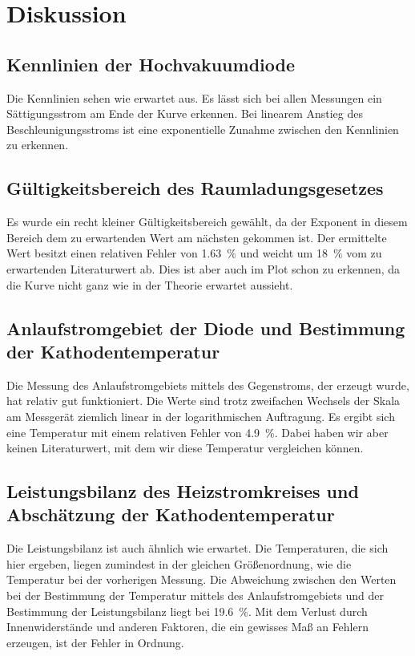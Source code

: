 \section{Diskussion}
\label{sec:Diskussion}

\subsection{Kennlinien der Hochvakuumdiode}
Die Kennlinien sehen wie erwartet aus. Es lässt sich bei allen Messungen ein Sättigungsstrom am Ende der Kurve erkennen. 
Bei linearem Anstieg des Beschleunigungsstroms ist eine exponentielle Zunahme zwischen den Kennlinien zu erkennen. %

\subsection{Gültigkeitsbereich des Raumladungsgesetzes}
Es wurde ein recht kleiner Gültigkeitsbereich gewählt, da der Exponent in diesem Bereich dem zu erwartenden Wert am 
nächsten gekommen ist. 
Der ermittelte Wert besitzt einen relativen Fehler von \SI{1.63}{\percent} und weicht um \SI{18}{\percent} vom zu 
erwartenden Literaturwert ab. 
Dies ist aber auch im Plot schon zu erkennen, da die Kurve nicht ganz wie in der Theorie erwartet aussieht. 

\subsection{Anlaufstromgebiet der Diode und Bestimmung der Kathodentemperatur}
Die Messung des Anlaufstromgebiets mittels des Gegenstroms, der erzeugt wurde, hat relativ gut funktioniert. 
Die Werte sind trotz zweifachen Wechsels der Skala am Messgerät ziemlich linear in der logarithmischen Auftragung. 
Es ergibt sich eine Temperatur mit einem relativen Fehler von \SI{4.9}{\percent}. Dabei haben wir aber keinen 
Literaturwert, mit dem wir diese Temperatur vergleichen können. %

\subsection{Leistungsbilanz des Heizstromkreises und Abschätzung der Kathodentemperatur}
Die Leistungsbilanz ist auch ähnlich wie erwartet. Die Temperaturen, die sich hier ergeben, liegen zumindest in der 
gleichen Größenordnung, wie die Temperatur bei der vorherigen Messung. Die Abweichung zwischen den Werten bei der 
Bestimmung der Temperatur mittels des Anlaufstromgebiets und der Bestimmung der Leistungsbilanz liegt bei 
\SI{19.6}{\percent}. Mit dem Verlust durch Innenwiderstände und anderen Faktoren, die ein gewisses Maß an Fehlern 
erzeugen, ist der Fehler in Ordnung. %

